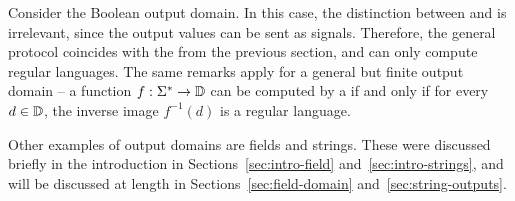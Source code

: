 \begin{myexample}
    Consider the Boolean output domain. In this case, the distinction between
     and  is irrelevant, since the output values
    can be sent as signals. Therefore, the general protocol coincides with the
     from the previous section, and  can only compute regular
    languages.  The same remarks apply for a general but finite output domain
    -- a function $f : \Sigma^* \to \mathbb D$ can be computed by a  if
    and only if for every $d \in \mathbb D$, the inverse image $f^{-1}(d)$ is a
    regular language.
\end{myexample}

Other examples of output domains are fields and strings. These were discussed
briefly in the introduction in Sections~\ref{sec:intro-field}
and~\ref{sec:intro-strings},  and will be discussed at length in
Sections~\ref{sec:field-domain} and~\ref{sec:string-outputs}.  




